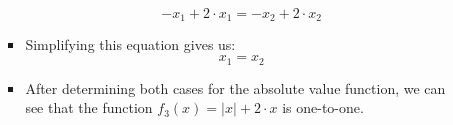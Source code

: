 \documentclass[12pt]{report}
\begin{document}
\begin{enumerate}[leftmargin=\labelsep]
\begin{enumerate}
\begin{tcolorbox}
\begin{itemize}[label={}]
                        \begin{equation*}
                            -x_1+2 \cdot x_1 = -x_2+2 \cdot x_2
                        \end{equation*}
                        \item Simplifying this equation gives us:
                        \begin{equation*}
                            x_1 = x_2
                        \end{equation*}
                        \item After determining both cases for the absolute value function, we can see that the function $f_3(x)=|x|+2 \cdot x$ is one-to-one.
                    \end{itemize}
                \end{tcolorbox}
        \end{enumerate}
            
\newpage


\end{enumerate}
\end{document}
